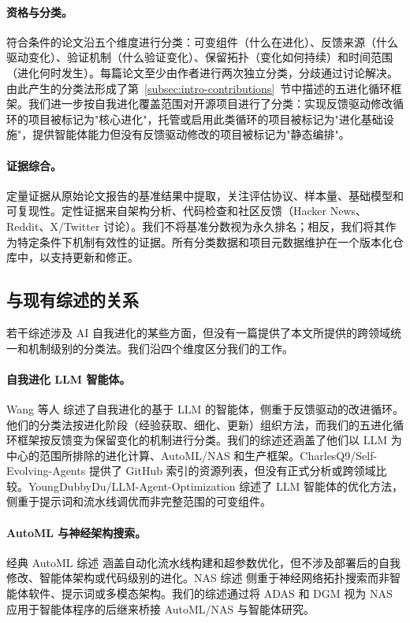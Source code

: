 \paragraph{资格与分类。} 符合条件的论文沿五个维度进行分类：可变组件（什么在进化）、反馈来源（什么驱动变化）、验证机制（什么验证变化）、保留拓扑（变化如何持续）和时间范围（进化何时发生）。每篇论文至少由作者进行两次独立分类，分歧通过讨论解决。由此产生的分类法形成了第~\ref{subsec:intro-contributions}~节中描述的五进化循环框架。我们进一步按自我进化覆盖范围对开源项目进行了分类：实现反馈驱动修改循环的项目被标记为"核心进化"，托管或启用此类循环的项目被标记为"进化基础设施"，提供智能体能力但没有反馈驱动修改的项目被标记为"静态编排"。

\paragraph{证据综合。} 定量证据从原始论文报告的基准结果中提取，关注评估协议、样本量、基础模型和可复现性。定性证据来自架构分析、代码检查和社区反馈（Hacker News、Reddit、X/Twitter 讨论）。我们不将基准分数视为永久排名；相反，我们将其作为特定条件下机制有效性的证据。所有分类数据和项目元数据维护在一个版本化仓库中，以支持更新和修正。

\subsection{与现有综述的关系}
\label{subsec:intro-survey-comparison}

若干综述涉及 AI 自我进化的某些方面，但没有一篇提供了本文所提供的跨领域统一和机制级别的分类法。我们沿四个维度区分我们的工作。

\paragraph{自我进化 LLM 智能体。} Wang 等人 \cite{wang2025selfevolving} 综述了自我进化的基于 LLM 的智能体，侧重于反馈驱动的改进循环。他们的分类法按进化阶段（经验获取、细化、更新）组织方法，而我们的五进化循环框架按反馈变为保留变化的机制进行分类。我们的综述还涵盖了他们以 LLM 为中心的范围所排除的进化计算、AutoML/NAS 和生产框架。CharlesQ9/Self-Evolving-Agents \cite{charlesq9selfevolving} 提供了 GitHub 索引的资源列表，但没有正式分析或跨领域比较。YoungDubbyDu/LLM-Agent-Optimization \cite{youngdubbydu2026optimization} 综述了 LLM 智能体的优化方法，侧重于提示词和流水线调优而非完整范围的可变组件。

\paragraph{AutoML 与神经架构搜索。} 经典 AutoML 综述 \cite{he2021automl,yao2018taking} 涵盖自动化流水线构建和超参数优化，但不涉及部署后的自我修改、智能体架构或代码级别的进化。NAS 综述 \cite{elsken2019neural,ren2021comprehensive} 侧重于神经网络拓扑搜索而非智能体软件、提示词或多模态架构。我们的综述通过将 ADAS \cite{adas2025} 和 DGM \cite{darwingodelmachine2025} 视为 NAS 应用于智能体程序的后继来桥接 AutoML/NAS 与智能体研究。

